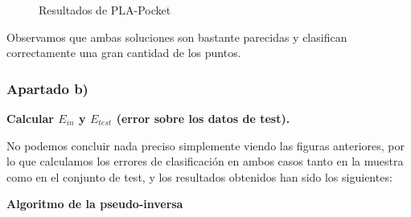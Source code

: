 \documentclass[a4]{article}
\begin{document}
\begin{figure}[H]
	\centering    
	\caption{Resultados de PLA-Pocket}
	\label{fig:pocket}
\end{figure}

Observamos que ambas soluciones son bastante parecidas y clasifican correctamente una gran cantidad de los puntos. 

\subsubsection{Apartado b)}
\textbf{Calcular $ E_{in} $ y $ E_{test} $ (error sobre los datos de test).}

No podemos concluir nada preciso simplemente viendo las figuras anteriores, por lo que calculamos los errores de clasificación en ambos casos tanto en la muestra como en el conjunto de test, y los resultados obtenidos han sido los siguientes:

\textbf{Algoritmo de la pseudo-inversa}
\end{document}
